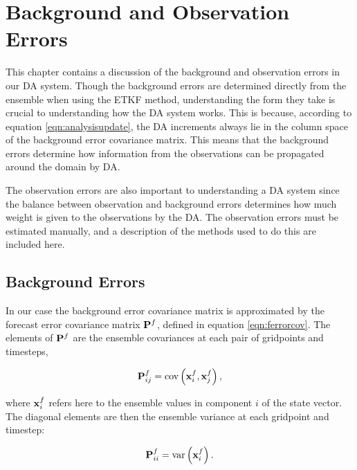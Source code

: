 
\chapter{Background and Observation Errors} %

\label{chap:bandoerrs} %

This chapter contains a discussion of the background and observation errors in our DA system. Though the background errors are determined directly from the ensemble when using the ETKF method, understanding the form they take is crucial to understanding how the DA system works. This is because, according to equation \ref{eqn:analysisupdate}, the DA increments always lie in the column space of the background error covariance matrix. This means that the background errors determine how information from the observations can be propagated around the domain by DA.

The observation errors are also important to understanding a DA system since the balance between observation and background errors determines how much weight is given to the observations by the DA. The observation errors must be estimated manually, and a description of the methods used to do this are included here.


\section{Background Errors}
\label{sec:bgerrors}

In our case the background error covariance matrix is approximated by the forecast error covariance matrix $\mathbf{P}^f$, defined in equation \ref{eqn:ferrorcov}. The elements of $\mathbf{P}^f$ are the ensemble covariances at each pair of gridpoints and timesteps,

\begin{equation}
\mathbf{P}^f_{ij} = \text{cov}\left( \mathbf{x}^f_i, \mathbf{x}^f_j \right),
\end{equation}

where $\mathbf{x}^f_i$ refers here to the ensemble values in component $i$ of the state vector. The diagonal elements are then the ensemble variance at each gridpoint and timestep:

\begin{equation}
\mathbf{P}^f_{ii} = \text{var}\left( \mathbf{x}^f_i \right).
\end{equation}

